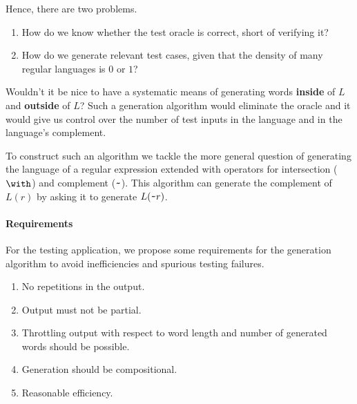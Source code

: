 Hence, there are two problems.
\begin{enumerate}
\item How do we know whether the test oracle is correct, short of
  verifying it?
\item How do we generate relevant test cases, given
  that the density of  many regular languages is
  $0$ or $1$?
\end{enumerate}


Wouldn't it be nice to have a systematic means
of generating words \textbf{inside} of $L$ and \textbf{outside} of
$L$? Such a generation algorithm would eliminate the oracle
and it would give us control over the number of test inputs
in the language and in the language's complement.

To construct such an algorithm we tackle the more general question of
generating the language of a regular expression extended with
operators for intersection ($\Rintersect{}{}$) and complement
($\texttt{\textasciitilde}{}$). This algorithm can generate the complement of
$L(r)$ by asking it to generate $L(\texttt{\textasciitilde} r)$.

\paragraph{Requirements}
\label{sec:requirements}

For the testing application, we propose some requirements for the generation algorithm to
avoid inefficiencies and spurious testing failures.
\begin{enumerate}
\item No repetitions in the output. %
\item Output must not be partial.
\item Throttling output with respect to word
  length and number of generated words should be possible.
\item Generation should be compositional.
\item Reasonable efficiency.
\end{enumerate}

